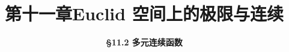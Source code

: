 \everymath{\displaystyle}



\title[第十一章\\
Euclid空间上的极限与连续]{\texorpdfstring{\LARGE \bfseries 第十一章\quad Euclid 空间上的极限与连续}{第十一章 Euclid 空间上的极限与连续}} %
\author[\S 11.2\\
多元连续函数] %
{\Large \bfseries \S 11.2 多元连续函数}
\date{}





\begin{frame}

\titlepage %

\end{frame}





